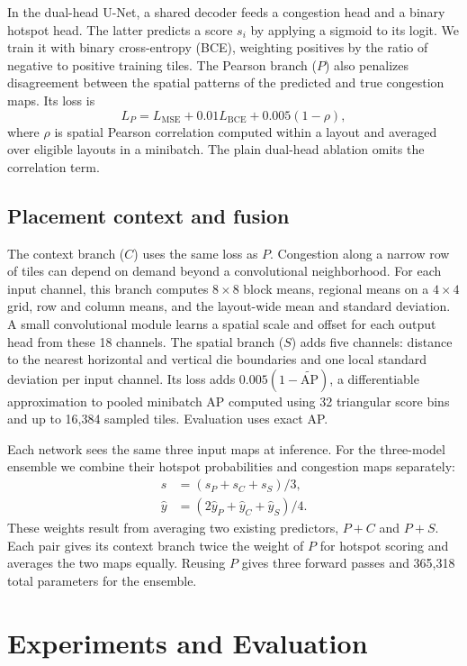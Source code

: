 \IfFileExists{./ieeeconf.cls}{\documentclass[9pt]{ieeeconf}}{\documentclass[conference]{IEEEtran}\usepackage[T1]{fontenc}}
\begin{document}
In the dual-head U-Net, a shared decoder feeds a congestion head and a binary hotspot head. The latter predicts a score $s_i$ by applying a sigmoid to its logit. We train it with binary cross-entropy (BCE), weighting positives by the ratio of negative to positive training tiles. The Pearson branch ($P$) also penalizes disagreement between the spatial patterns of the predicted and true congestion maps. Its loss is
\begin{equation}
 L_P = L_{\mathrm{MSE}} + 0.01L_{\mathrm{BCE}} +
                  0.005(1-\rho),
\end{equation}
where $\rho$ is spatial Pearson correlation computed within a layout and averaged over eligible layouts in a minibatch. The plain dual-head ablation omits the correlation term.

\subsection{Placement context and fusion}
The context branch ($C$) uses the same loss as $P$. Congestion along a narrow row of tiles can depend on demand beyond a convolutional neighborhood. For each input channel, this branch computes $8\times8$ block means, regional means on a $4\times4$ grid, row and column means, and the layout-wide mean and standard deviation. A small convolutional module learns a spatial scale and offset for each output head from these 18 channels. The spatial branch ($S$) adds five channels: distance to the nearest horizontal and vertical die boundaries and one local standard deviation per input channel. Its loss adds $0.005(1-\widetilde{\mathrm{AP}})$, a differentiable approximation to pooled minibatch AP computed using 32 triangular score bins and up to 16,384 sampled tiles. Evaluation uses exact AP.

Each network sees the same three input maps at inference. For the three-model ensemble we combine their hotspot probabilities and congestion maps separately:
\begin{align}
 s &= (s_P+s_C+s_S)/3, \\
 \hat y &= (2\hat y_P+\hat y_C+\hat y_S)/4.
\end{align}
These weights result from averaging two existing predictors, $P+C$ and $P+S$. Each pair gives its context branch twice the weight of $P$ for hotspot scoring and averages the two maps equally. Reusing $P$ gives three forward passes and 365,318 total parameters for the ensemble.

\section{Experiments and Evaluation}
\end{document}
